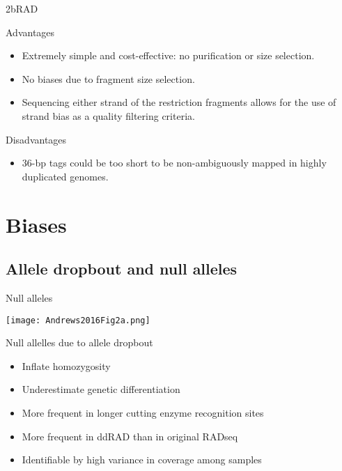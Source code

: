 \documentclass[presentation]{beamer}
\begin{document}
\begin{frame}[label=sec-2-4-2]{2bRAD \citep{Wang2012}}
\begin{block}{Advantages}
\begin{itemize}
\item Extremely simple and cost-effective: no purification or size selection.
\item No biases due to fragment size selection.
\item Sequencing either strand of the restriction fragments allows for the
use of strand bias as a quality filtering criteria.
\end{itemize}
\end{block}
\begin{block}{Disadvantages}
\begin{itemize}
\item 36-bp tags could be too short to be non-ambiguously mapped in highly
duplicated genomes.
\end{itemize}
\end{block}
\end{frame}


\section{Biases}
\label{sec-3}

\subsection{Allele dropbout and null alleles}
\label{sec-3-1}


\begin{frame}[label=sec-3-1-1]{Null alleles}
\begin{center}
\texttt{[image: Andrews2016Fig2a.png]}

\tiny{Null allelles due to allele dropbout\\ \citep{Andrews2016}}
\end{center}
\begin{itemize}
\item Inflate homozygosity
\item Underestimate genetic differentiation
\item More frequent in longer cutting enzyme recognition sites
\item More frequent in ddRAD than in original RADseq
\item Identifiable by high variance in coverage among samples
\end{itemize}
\end{frame}
\end{document}
